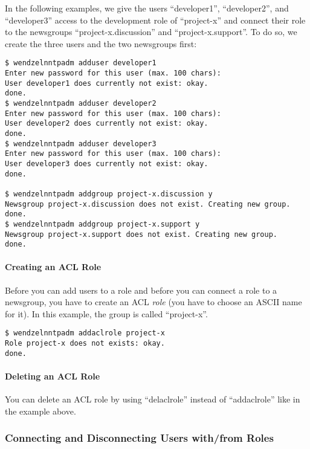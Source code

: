 \documentclass[12pt,fleqn,leqno]{scrbook}
\begin{document}
In the following examples, we give the users ``developer1'',
``developer2'', and ``developer3'' access to the development role of
``project-x'' and connect their role to the newsgroups
``project-x.discussion'' and ``project-x.support''. To do so, we create
the three users and the two newsgroups first:

\begin{verbatim}
$ wendzelnntpadm adduser developer1
Enter new password for this user (max. 100 chars):
User developer1 does currently not exist: okay.
done.
$ wendzelnntpadm adduser developer2
Enter new password for this user (max. 100 chars):
User developer2 does currently not exist: okay.
done.
$ wendzelnntpadm adduser developer3
Enter new password for this user (max. 100 chars):
User developer3 does currently not exist: okay.
done.

$ wendzelnntpadm addgroup project-x.discussion y
Newsgroup project-x.discussion does not exist. Creating new group.
done.
$ wendzelnntpadm addgroup project-x.support y
Newsgroup project-x.support does not exist. Creating new group.
done.
\end{verbatim}

\hypertarget{creating-an-acl-role-1}{%
\paragraph{Creating an ACL Role}\label{creating-an-acl-role-1}}

Before you can add users to a role and before you can connect a role to
a newsgroup, you have to create an ACL \emph{role} (you have to choose
an ASCII name for it). In this example, the group is called
``project-x''.

\begin{verbatim}
$ wendzelnntpadm addaclrole project-x
Role project-x does not exists: okay.
done.
\end{verbatim}

\hypertarget{deleting-an-acl-role-1}{%
\paragraph{Deleting an ACL Role}\label{deleting-an-acl-role-1}}

You can delete an ACL role by using ``delaclrole'' instead of
``addaclrole'' like in the example above.

\hypertarget{connecting-and-disconnecting-users-withfrom-roles-1}{%
\subsubsection{Connecting and Disconnecting Users with/from
Roles}\label{connecting-and-disconnecting-users-withfrom-roles-1}}
\end{document}
